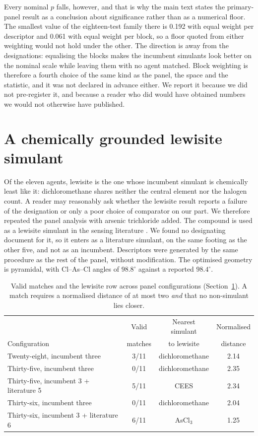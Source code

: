 \documentclass[journal=jacsat,manuscript=suppinfo,margin=1in]{achemso}
\begin{document}
Every nominal $p$ falls, however, and that is why the main text states the
primary-panel result as a conclusion about significance rather than as a
numerical floor. The smallest value of the eighteen-test family there is 0.192
with equal weight per descriptor and 0.061 with equal weight per block, so a
floor quoted from either weighting would not hold under the other. The direction
is away from the designations: equalising the blocks makes the incumbent
simulants look better on the nominal scale while leaving them with no agent
matched. Block weighting is therefore a fourth choice of the same kind as the
panel, the space and the statistic, and it was not declared in advance either.
We report it because we did not pre-register it, and because a reader who did
would have obtained numbers we would not otherwise have published.

\section{A chemically grounded lewisite simulant}
\label{sec:si-ascl3}

\begin{sloppypar}
Of the eleven agents, lewisite is the one whose incumbent simulant is
chemically least like it: dichloromethane shares neither the central element
nor the halogen count. A reader may reasonably ask whether the lewisite result
reports a failure of the designation or only a poor choice of comparator on
our part. We therefore repeated the panel analysis with arsenic trichloride
added. The compound is used as a lewisite simulant in the sensing
literature \cite{lee2016lewisite}. We found no designating document for it,
so it enters as a literature simulant, on the same footing as the other
five, and not as an incumbent. Descriptors were generated by the same procedure as the
rest of the panel, without modification. The optimised geometry is pyramidal,
with Cl--As--Cl angles of $98.8^\circ$ against a reported $98.4^\circ$.
\end{sloppypar}

\begin{table}[htbp]
\centering
\caption{Valid matches and the lewisite row across panel configurations
(Section~\ref{sec:si-ascl3}). A match requires a normalised distance of at
most two \emph{and} that no non-simulant lies closer.}
\label{tab:si-ascl3}
\small
\begin{tabular}{@{}lccc@{}}
\hline
 & Valid & Nearest simulant & Normalised \\
Configuration & matches & to lewisite & distance \\
\hline
Twenty-eight, incumbent three & 3/11 & dichloromethane & 2.14 \\
Thirty-five, incumbent three & 0/11 & dichloromethane & 2.35 \\
Thirty-five, incumbent 3 + literature 5 & 5/11 & CEES & 2.34 \\
Thirty-six, incumbent three & 0/11 & dichloromethane & 2.04 \\
Thirty-six, incumbent 3 + literature 6 & 6/11 & AsCl$_3$ & 1.25 \\
\hline
\end{tabular}
\end{table}
\end{document}
